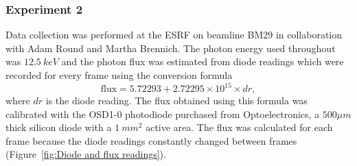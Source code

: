\subsubsection{Experiment 2}
\label{subs:Experiment 2 - data col}
Data collection was performed at the ESRF on beamline BM29 in collaboration with Adam Round and Martha Brennich.
The photon energy used throughout was $12.5\ keV$ and the photon flux was estimated from diode readings which were recorded for every frame using the conversion formula
\begin{equation}
    \text{flux} = 5.72293 + 2.72295 \times 10^{15} \times dr,
\end{equation}
where $dr$ is the diode reading.
The flux obtained using this formula was calibrated with the OSD1-0 photodiode purchased from Optoelectronics, a $500 \mu m$ thick silicon diode with a $ 1\ mm^2 $ active area.
The flux was calculated for each frame because the diode readings constantly changed between frames (Figure~\ref{fig:Diode and flux readings}).
